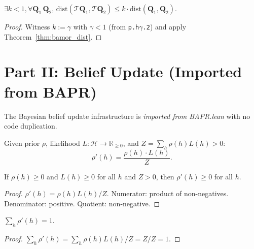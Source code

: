 \begin{theorem}
$\exists k < 1, \forall \mathbf{Q}_1\,\mathbf{Q}_2,\, \mathrm{dist}(\mathcal{T}\mathbf{Q}_1, \mathcal{T}\mathbf{Q}_2) \le k \cdot \mathrm{dist}(\mathbf{Q}_1, \mathbf{Q}_2)$.
\end{theorem}
\begin{proof}
Witness $k := \gamma$ with $\gamma < 1$ (from \texttt{p.h$\gamma$.2}) and apply Theorem~\ref{thm:bamor_dist}.
\end{proof}


\section{Part II: Belief Update (Imported from BAPR)}
\label{app:belief}

The Bayesian belief update infrastructure is \emph{imported from BAPR.lean} with no code duplication.

\begin{definition}
Given prior $\rho$, likelihood $L : \mathcal{H} \to \mathbb{R}_{\ge 0}$, and $Z = \sum_h \rho(h) L(h) > 0$:
\begin{equation}
    \rho'(h) = \frac{\rho(h) \cdot L(h)}{Z}.
\end{equation}
\end{definition}

\begin{lemma}
If $\rho(h) \ge 0$ and $L(h) \ge 0$ for all $h$ and $Z > 0$, then $\rho'(h) \ge 0$ for all $h$.
\end{lemma}
\begin{proof}
$\rho'(h) = \rho(h) L(h) / Z$.  Numerator: product of non-negatives.  Denominator: positive.  Quotient: non-negative.
\end{proof}

\begin{lemma}
$\sum_h \rho'(h) = 1$.
\end{lemma}
\begin{proof}
$\sum_h \rho'(h) = \sum_h \rho(h) L(h) / Z = Z / Z = 1$.
\end{proof}

